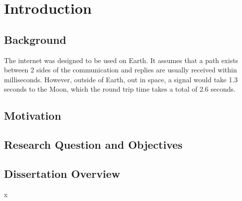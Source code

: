 \chapter{Introduction}
\label{ch:introduction}

\section{Background}
The internet was designed to be used on Earth. It assumes that a path exists between 2 sides of the communication and replies are usually received within milliseconds. However, outside of Earth, out in space, a signal would take 1.3 seconds to the Moon, which the round trip time takes a total of 2.6 seconds.


\section{Motivation}

\section{Research Question and Objectives}

\section{Dissertation Overview}x
